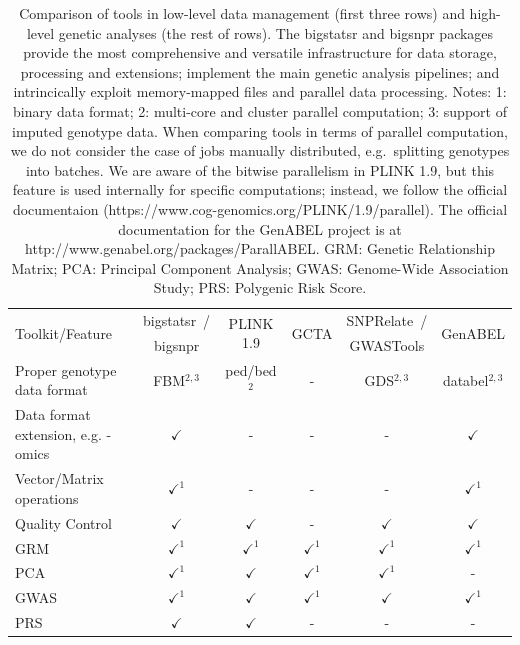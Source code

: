 \documentclass[a4paper, 11pt]{article}
\begin{document}
\begin{table}[!h]
\caption{Comparison of tools in low-level data management (first three rows) and high-level genetic analyses (the rest of rows). The bigstatsr and bigsnpr packages provide the most comprehensive and versatile infrastructure for data storage, processing and extensions; implement the main genetic analysis pipelines; and intrincically exploit memory-mapped files and parallel data processing.
Notes:
1: binary data format;
2: multi-core and cluster parallel computation;
3: support of imputed genotype data.
When comparing tools in terms of parallel computation, we do not consider the case of jobs manually distributed, e.g.\ splitting genotypes into batches. We are aware of the bitwise parallelism in PLINK 1.9, but this feature is used internally for specific computations; instead, we follow the official documentaion (https://www.cog-genomics.org/PLINK/1.9/parallel). The official documentation for the GenABEL project is at http://www.genabel.org/packages/ParallABEL.
GRM: Genetic Relationship Matrix; PCA: Principal Component Analysis; GWAS: Genome-Wide Association Study; PRS: Polygenic Risk Score.}
\begin{center}
\begin{adjustbox}{max width=\textwidth}
\begin{tabular}{|l|c|c|c|c|c|}
\hline
\multirow{2}{*}{Toolkit/Feature} & bigstatsr~/ & \multirow{2}{*}{PLINK 1.9} & \multirow{2}{*}{GCTA} & SNPRelate~/ & \multirow{2}{*}{GenABEL} \\
 & bigsnpr & & & GWASTools &  \\
\hline
\hline
Proper genotype data format & FBM$^{2,3}$ & ped/bed$^2$ & - & GDS$^{2,3}$ & databel$^{2,3}$ \\ \hline
Data format extension, e.g. -omics & $\checkmark$ & - & - & - & $\checkmark$ \\ \hline
Vector/Matrix operations & $\checkmark^1$ & - & - & - & $\checkmark^1$ \\ \hline
Quality Control & $\checkmark$ & $\checkmark$ & - & $\checkmark$ & $\checkmark$ \\ \hline
GRM & $\checkmark^1$ & $\checkmark^1$ & $\checkmark^1$ & $\checkmark^1$ & $\checkmark^1$ \\ \hline
PCA & $\checkmark^1$ & $\checkmark$ & $\checkmark^1$ & $\checkmark^1$ & - \\ \hline
GWAS & $\checkmark^1$ & $\checkmark$ & $\checkmark^1$ & $\checkmark$ & $\checkmark^1$ \\ \hline
PRS & $\checkmark$ & $\checkmark$ & - & - & - \\ \hline
\end{tabular}
\end{adjustbox}
\end{center}
\label{tab:andrey}
\end{table}
\end{document}
